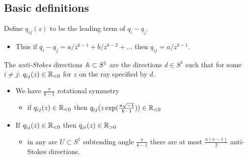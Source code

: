 \subsection{Basic definitions}
Define $q_{ij}(z)$ to be the leading term of $q_i-q_j$.
\begin{itemize}
  \item Thus if $q_i-q_j=a/z^{k-1}+b/z^{k-2}+\dots$ then $q_{ij}=a/z^{k-1}$.
\end{itemize}
\begin{defn}[Definition 3.2]
  The \emph{anti-Stokes} directions $\mathbb{A}\subset S^1$ are the directions $d\in
  S^1$ such that for some $i \neq j$: $q_{ij}(z)\in\mathbb{R}_{<0}$ for $z$ on the ray
  specified by $d$.
\end{defn}
\begin{center}
\end{center}
\begin{rem}
  \begin{itemize}
    \item We have $\frac{\pi}{k-1}$ rotational symmetry
      \begin{itemize}
        \item if $q_{ij}(z)\in\mathbb{R}_{<0}$ then
          $q_{ij}(z\exp(\frac{\pi\sqrt{-1}}{k-1}))\in\mathbb{R}_{<0}$
      \end{itemize}
    \item If $q_{ij}(z)\in\mathbb{R}_{<0}$ then $q_{ji}(z)\in\mathbb{R}_{>0}$
      \begin{itemize}
        \item in any arc $U \subset S^1$ subtending angle $\frac{\pi}{k-1}$
          there are at most $\frac{n(n-1)}{2}$ anti-Stokes directions.
      \end{itemize}
  \end{itemize}
\end{rem}
